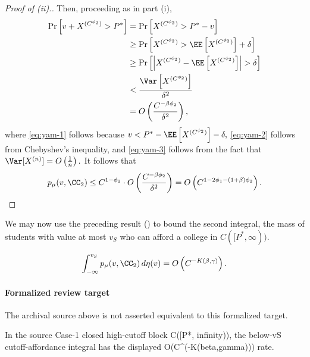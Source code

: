 \documentclass[10pt]{article}
\begin{document}
\begin{ReviewVerbatim}
\begin{proof}[Proof of (ii).]
    Then, proceeding as in part (i),
    \begin{align}
        \Pr\left[v + X^{(C^{\phi_2})} > P^* \right] &= \Pr\left[X^{(C^{\phi_2})} > P^* - v\right]\\
        &\ge \Pr\left[X^{(C^{\phi_2})} > \EE\left[X^{(C^{\phi_2})}\right] + \delta \right] \label{eq:yam-1} \\
        &\ge \Pr\left[\left|X^{(C^{\phi_2})} - \EE\left[X^{(C^{\phi_2})}\right]\right| > \delta \right] \\
        &< \frac{\Var\left[X^{(C^{\phi_2})}\right]}{\delta^2} \label{eq:yam-2} \\
        &= O\left(\frac{C^{-\beta \phi_2}}{\delta^2}\right), \label{eq:yam-3}
    \end{align}
    where \eqref{eq:yam-1} follows because $v < P^* - \EE\left[X^{(C^{\phi_2})}\right]  - \delta,$ \eqref{eq:yam-2} follows from Chebyshev's inequality, and \eqref{eq:yam-3} follows from the fact that $\Var[X^{(n)}] = O\left(\frac{1}{n}\right).$ It follows that
    \begin{equation}
        p_\mu(v, \CC_2) \le C^{1 - \phi_2}\cdot O\left(\frac{C^{-\beta \phi_2}}{\delta^2}\right) = O\left(C^{1-2\phi_1-(1+\beta)\phi_2}\right).
    \end{equation}
\end{proof}

We may now use the preceding result () to bound the second integral, the mass of students with value at most $v_S$ who can afford a college in $C([P^*,\infty))$.

\begin{proposition}\label{prop:duck-2}
\begin{equation}
    \int_{-\infty}^{v_S} p_\mu(v, \CC_2)\,d\eta(v) = O\left(C^{-K(\beta,\gamma)}\right).
\end{equation}
\end{proposition}
\end{ReviewVerbatim}


\paragraph{Formalized review target}
The archival source above is not asserted equivalent to this formalized target.
\begin{ReviewVerbatim}
In the source Case-1 closed high-cutoff block C([P*, infinity)), the below-vS cutoff-affordance integral has the displayed O(C^(-K(beta,gamma))) rate.
\end{ReviewVerbatim}
\end{document}
